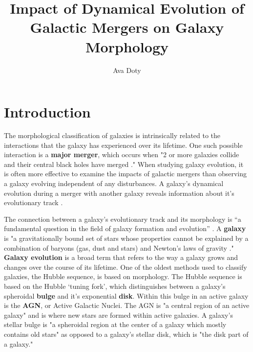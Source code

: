 \documentclass[linenumbers,trackchanges,twocolumn]{aastex7}
\begin{document}
\title{Impact of Dynamical Evolution of Galactic Mergers on Galaxy Morphology}
\author[orcid=0000-0000-0000-0001,sname='North America']{Ava Doty}


\section{Introduction} 

The morphological classification of galaxies is intrinsically related to the interactions that the galaxy has experienced over its lifetime. One such possible interaction is a \textbf{major merger}, which occurs when "2 or more galaxies collide and their central black holes have merged \citep{Willman_2012}." When studying galaxy evolution, it is often more effective to examine the impacts of galactic mergers than observing a galaxy evolving independent of any disturbances. A galaxy's dynamical evolution during a merger with another galaxy reveals information about it's evolutionary track \citep{Brooks2016}.

The connection between a galaxy’s evolutionary track and its morphology is “a fundamental question in the field of galaxy formation and evolution” \citep{Kannan2015}. A \textbf{galaxy} is "a gravitationally bound set of stars whose properties cannot be explained by a combination of baryons (gas, dust and stars) and Newton’s laws of gravity \citep{Willman_2012}." \textbf{Galaxy evolution} is a broad term that refers to the way a galaxy grows and changes over the course of its lifetime. One of the oldest methods used to classify galaxies, the Hubble sequence, is based on morphology. The Hubble sequence is based on the Hubble ‘tuning fork’, which distinguishes between a galaxy's spheroidal \textbf{bulge} and it's exponential \textbf{disk}. Within this bulge in an active galaxy is the \textbf{AGN}, or Active Galactic Nuclei. The AGN is "a central region of an active galaxy" and is where new stars are formed within active galaxies. A galaxy's stellar bulge is "a spheroidal region at the center of a galaxy which mostly contains old stars" as opposed to a galaxy's stellar disk, which is "the disk part of a galaxy."
\end{document}
